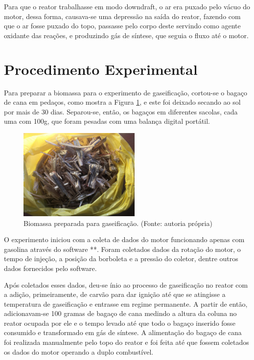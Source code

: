 Para que o reator trabalhasse em modo downdraft, o ar era puxado pelo vácuo do motor, dessa forma, causava-se uma depressão na saída do reator, fazendo com que o ar fosse puxado do topo, passasse pelo corpo deste servindo como agente oxidante das reações, e produzindo gás de síntese, que seguia o fluxo até o motor.

\section{Procedimento Experimental}

Para preparar a biomassa para o experimento de gaseificação, cortou-se o bagaço de cana em pedaços, como mostra a Figura \ref{bagaco_cortado}, e este foi deixado secando ao sol por mais de 30 dias. Separou-se, então, os bagaços em diferentes sacolas, cada uma com 100g, que foram pesadas com uma balança digital portátil.

\begin{figure}[!htb]
	\centering
	\includegraphics[width=6cm]{Figuras/bagaco_cortado}
	\caption{Biomassa preparada para gaseificação. (Fonte: autoria própria)}
	\label{bagaco_cortado}
\end{figure}

O experimento iniciou com a coleta de dados do motor funcionando apenas com gasolina através do software **. Foram coletados dados da rotação do motor, o tempo de injeção, a posição da borboleta e a pressão do coletor, dentre outros dados fornecidos pelo software.

Após coletados esses dados, deu-se ínio ao processo de gaseificação no reator com a adição, primeiramente, de carvão para dar ignição até que se atingisse a temperatura de gaseificação e entrasse em regime permanente.
A partir de então, adicionavam-se 100 gramas de bagaço de cana medindo a altura da coluna no reator ocupada por ele e o tempo levado até que todo o bagaço inserido fosse consumido e transformado em gás de síntese. A alimentação do bagaço de cana foi realizada manualmente pelo topo do reator e foi feita até que fossem coletados os dados do motor operando a duplo combustível.

